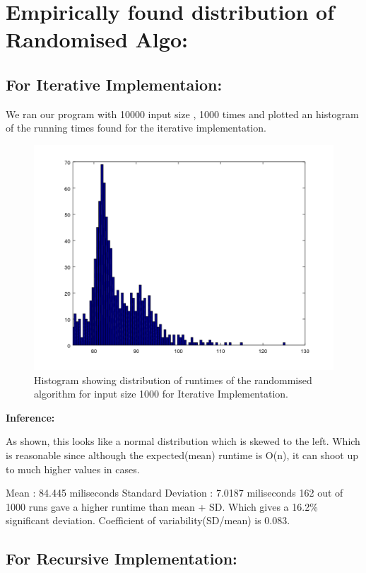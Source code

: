 \documentclass{article}
\begin{document}
\newpage

\section*{Empirically found distribution of Randomised Algo:}

\subsection*{For Iterative Implementaion:}
	We ran our program with 10000 input size , 1000 times and plotted an histogram of the running times found for the iterative implementation. 
	
\begin{figure}[th]%
\centering
\includegraphics[width=0.8\columnwidth]{incrhist.png}%
\caption{Histogram showing distribution of runtimes of the randommised algorithm for input size 1000 for Iterative Implementation. }
\label{fig:proto}%
\end{figure}

\textbf{Inference:}

As shown, this looks like a normal distribution which is skewed to the left. Which is reasonable since although the expected(mean) runtime is O(n), it can shoot up to much higher values in cases.

Mean : 84.445 miliseconds
Standard Deviation : 7.0187 miliseconds
162 out of 1000 runs gave a higher runtime than mean + SD. Which gives a 16.2\% significant deviation. Coefficient of variability(SD/mean) is 0.083.\\

\newpage

\subsection*{For Recursive Implementation:}
\end{document}
